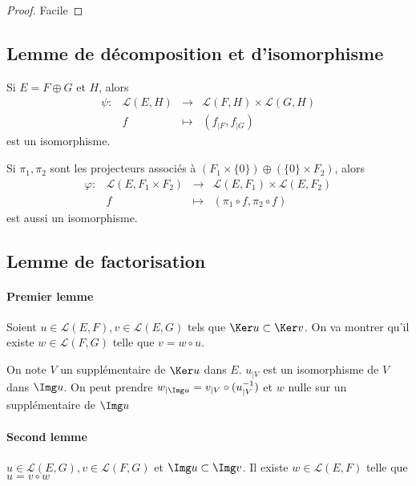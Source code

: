  \begin{proof}
     Facile
 \end{proof}

 \subsection{Lemme de décomposition et d'isomorphisme}

 Si $E=F\oplus G$ et  $H$, alors  \[
     \begin{matrix}
         \psi:& \mathcal  L(E, H) & \longrightarrow & \mathcal  L(F, H)\times \mathcal  L(G, H) \\
              & f & \longmapsto & (f_{|F}, f_{|G})
     \end{matrix}
 \]
 est un isomorphisme.

 Si $\pi_1, \pi_2$ sont les projecteurs associés à $(F_1\times \{0\} )\oplus (\{ 0\}\times F_2 )$, alors \[
     \begin{matrix}
         \varphi:& \mathcal  L(E, F_1\times  F_2) & \longrightarrow & \mathcal  L(E, F_1)\times \mathcal  L(E, F_2)  \\
                 & f & \longmapsto & (\pi_1\circ f, \pi_2\circ f)
     \end{matrix}
 \]
 est aussi un isomorphisme.

 \subsection{Lemme de factorisation}

 \paragraph{Premier lemme}
 Soient $u \in  \mathcal  L(E, F), v \in  \mathcal  L(E, G)$ tels que $\Ker u \subset \Ker v$. On va montrer qu'il existe  $w \in  \mathcal  L(F, G)$ telle que $v=w\circ u$.

 On note $V$ un supplémentaire de  $\Ker u$ dans  $E$.  $u_{|V}$ est un isomorphisme de $V$ dans  $\Img u$. On peut prendre  $w_{|\Img u}=v_{|V}\circ (u_{|V}^{-1})$ et $w$ nulle sur un supplémentaire de  $\Img u$

 \paragraph{Second lemme}
 $u \in  \mathcal  L(E, G), v \in  \mathcal  L(F, G)$ et $\Img u \subset \Img v$. Il existe  $w \in  \mathcal  L(E, F)$ telle que $u=v\circ w$

